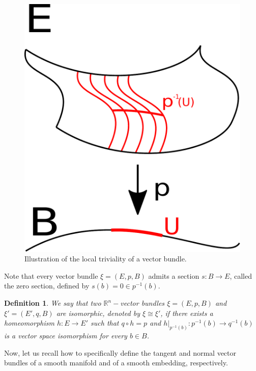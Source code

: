 \documentclass[12pt,oneside]{book}
\newtheorem{defi}   {Definition}[chapter]
\newcommand{\R}{\mathbb{R}}
\begin{document}
    \begin{figure}[h]
        \centering
        \includegraphics[scale=0.3]{fibrado.pdf}
        \caption{Illustration of the local triviality of a vector bundle.}
    \end{figure}
    
    Note that every vector bundle $\xi=(E,p,B)$ admits a section $s:B\to E$, called the zero section, defined by 
    $s(b)=0\in p^{-1}(b)$.
    
    \begin{defi}\label{fv_iso}
        We say that two $\R^{n}-$vector bundles $\xi=(E,p,B)$ and $\xi'=(E',q,B)$ are isomorphic, denoted by 
        $\xi\cong\xi'$, if there exists a homeomorphism $h:E\to E'$ such that $q\circ h=p$ and $h|_{p^{-1}(b)}:p^{-1}(b)\to q^{-1}(b)$ is a 
        vector space isomorphism for every $b\in B$.
    \end{defi}
    
    Now, let us recall how to specifically define the tangent and normal vector bundles of a smooth manifold and of a smooth embedding, 
    respectively.
    
\end{document}
